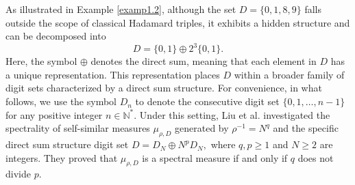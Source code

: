 \documentclass[11pt]{article}
\numberwithin{equation}{section}
\begin{document}
As illustrated in Example \ref{examp1.2}, although the set \( D=\{0,1,8,9\} \) falls outside the scope of classical Hadamard triples, it exhibits a hidden structure and can be decomposed into
\[
D=\{0,1\}\oplus 2^{3}\{0,1\}.
\]
Here, the symbol $\oplus$ denotes the direct sum, meaning that each element in $D$ has a unique representation. This representation places $D$ within a broader family of digit sets characterized by a  direct sum structure. 
For convenience, in what follows, we use the symbol $D_n$ to denote the consecutive digit set $\{0,1,\dots,n-1\}$ for any positive integer $n \in \mathbb{N}^*$. Under this setting, Liu et al. \cite{Liu-Peng-Wu_2019} investigated the spectrality of self-similar measures $\mu_{\rho,D}$ generated by $\rho^{-1}=N^{q}$ and the specific direct sum structure digit set
$
	D=D_N\oplus N^{p}D_N,
$
where $q,p \ge 1$ and $N \ge 2$ are integers. They proved that $\mu_{\rho,D}$ is a spectral measure if and only if $q$ does not divide $p$. 
\end{document}
